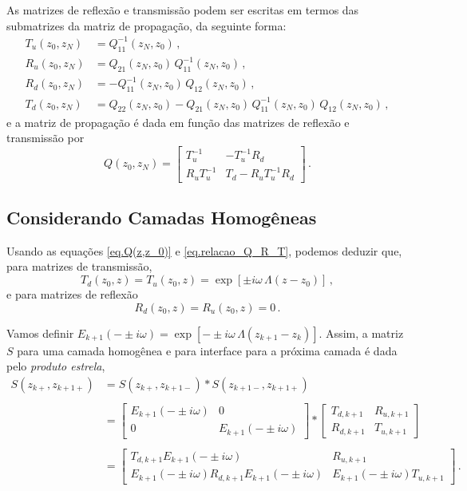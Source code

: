 As matrizes de reflex\~ao e transmiss\~ao podem ser escritas em termos das submatrizes da matriz de propaga\c{c}\~ao, da seguinte forma:
\begin{align}\nonumber
T_u(z_0,z_N)&=Q_{11}^{-1}(z_N,z_0)\,,\\\nonumber
R_u(z_0,z_N)&=Q_{21}(z_N,z_0)\,Q_{11}^{-1}(z_N,z_0)\,,\\\label{eq.relacao_Q_R_T}
R_d(z_0,z_N)&=-Q_{11}^{-1}(z_N,z_0)\,Q_{12}(z_N,z_0)\,,\\\nonumber
T_d(z_0,z_N)&=Q_{22}(z_N,z_0)-Q_{21}(z_N,z_0)\,Q_{11}^{-1}(z_N,z_0)\,Q_{12}(z_N,z_0)\,,
\end{align}
e a matriz de propaga\c{c}\~ao \'e dada em fun\c{c}\~ao das matrizes de reflex\~ao e transmiss\~ao por
\begin{equation*}
Q(z_0,z_N)=
\begin{bmatrix}
T_u^{-1}&-T_u^{-1}R_d\\
R_uT_u^{-1}&T_d-R_uT_u^{-1}R_d
\end{bmatrix}\,.
\end{equation*}

\subsection{Considerando Camadas Homog\^eneas}

Usando as equa\c{c}\~oes \ref{eq.Q(z,z_0)} e \ref{eq.relacao_Q_R_T}, podemos deduzir que, para matrizes de transmiss\~ao,
\begin{equation*}
T_d(z_0,z)=T_u(z_0,z)=\exp\left[\pm i\omega\,\Lambda(z-z_0)\right]\,,
\end{equation*}
e para matrizes de reflex\~ao
\begin{equation*}
R_d(z_0,z)=R_u(z_0,z)=0\,.
\end{equation*}

Vamos definir $E_{k+1}(-\pm i\omega)=\exp\left[-\pm i\omega\,\Lambda(z_{k+1}-z_k)\right]$. Assim, a matriz $S$ para uma camada homog\^enea e para interface para a pr\'oxima camada \'e dada pelo \textit{produto estrela},
\begin{align*}
S(z_{k+},z_{k+1+})&=S(z_{k+},z_{k+1-})*S(z_{k+1-},z_{k+1+})\\\\
&=
\begin{bmatrix}
E_{k+1}(-\pm i\omega)&0\\
0&E_{k+1}(-\pm i\omega)
\end{bmatrix}
*
\begin{bmatrix}
T_{d,k+1}&R_{u,k+1}\\
R_{d,k+1}&T_{u,k+1}
\end{bmatrix}\\\\
&=
\begin{bmatrix}
T_{d,k+1}E_{k+1}(-\pm i\omega)&R_{u,k+1}\\
E_{k+1}(-\pm i\omega)R_{d,k+1}E_{k+1}(-\pm i\omega)&E_{k+1}(-\pm i\omega)T_{u,k+1}
\end{bmatrix}\,.
\end{align*}